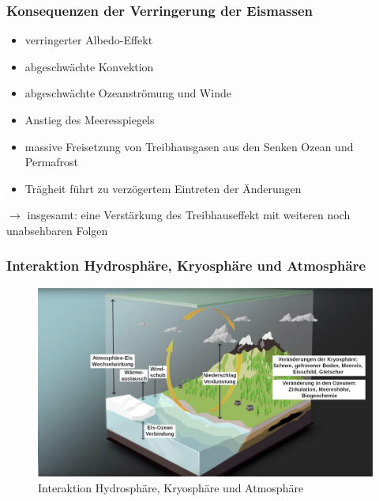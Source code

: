 \begin{frame}
	\frametitle{Konsequenzen der Verringerung der Eismassen}
	\begin{itemize}
		\item verringerter Albedo-Effekt
		\item abgeschwächte Konvektion
		\item abgeschwächte Ozeanströmung und Winde
		\item Anstieg des Meeresspiegels
		\item massive Freisetzung von Treibhausgasen aus den Senken Ozean und Permafrost
		\item Trägheit führt zu verzögertem Eintreten der Änderungen
	\end{itemize}

	$\rightarrow$ insgesamt: eine Verstärkung des Treibhauseffekt mit weiteren noch unabsehbaren Folgen

\end{frame}

\begin{frame}
	\frametitle{Interaktion Hydrosphäre, Kryosphäre und Atmosphäre}
	\begin{figure}
		\centering
		\includegraphics{bilder/WMO_Cycles_factors_waterAndIce.png}
		\caption{Interaktion Hydrosphäre, Kryosphäre und Atmosphäre}
	\end{figure}

\end{frame}


